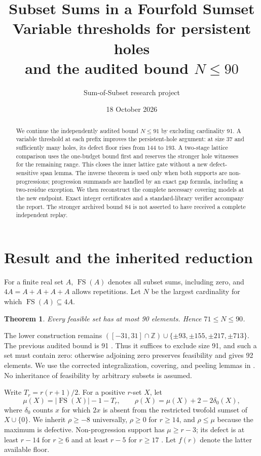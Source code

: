 \documentclass[11pt,a4paper]{article}
\title{Subset Sums in a Fourfold Sumset\\\large Variable thresholds for persistent holes\\and the audited bound $N\le90$}
\author{Sum-of-Subset research project}
\date{18 October 2026}
\newcommand{\FS}{\operatorname{FS}}
\newcommand{\Z}{\mathbb Z}
\newtheorem{theorem}{Theorem}[section]
\begin{document}
\maketitle
\begin{abstract}
We continue the independently audited bound $N\le91$ by excluding
cardinality 91. A variable threshold at each prefix improves the
persistent-hole argument: at size 37 and sufficiently many holes, its
defect floor rises from 144 to 193. A two-stage lattice comparison uses
the one-budget bound first and reserves the stronger hole witnesses for
the remaining range. This closes the inner lattice gate without a new
defect-sensitive span lemma. The inverse theorem is used only when both
supports are non-progressions; progression summands are handled by an
exact gap formula, including a two-residue exception. We then reconstruct
the complete necessary covering models at the new endpoint. Exact integer
certificates and a standard-library verifier accompany the report.
The stronger archived bound 84 is not asserted to have received a
complete independent replay.
\end{abstract}

\section{Result and the inherited reduction}
For a finite real set $A$, $\FS(A)$ denotes all subset sums, including
zero, and $4A=A+A+A+A$ allows repetitions. Let $N$ be the largest
cardinality for which $\FS(A)\subseteq4A$.
\begin{theorem}\label{main}
Every feasible set has at most 90 elements. Hence $71\le N\le90$.
\end{theorem}
The lower construction remains
$([-31,31]\cap\Z)\cup\{\pm93,\pm155,\pm217,\pm713\}$.
The previous audited bound is 91 \cite{previous}. Thus it suffices to
exclude size 91, and such a set must contain zero: otherwise adjoining
zero preserves feasibility and gives 92 elements. We use the corrected
integralization, covering, and peeling lemmas in \cite{foundation}.
No inheritance of feasibility by arbitrary subsets is assumed.

Write $T_r=r(r+1)/2$. For a positive $r$-set $X$, let
\[
 \mu(X)=|\FS(X)|-1-T_r,\qquad
 \rho(X)=\mu(X)+2-2\delta_0(X),
\]
where $\delta_0$ counts $x$ for which $2x$ is absent from the restricted
twofold sumset of $X\cup\{0\}$. We inherit $\rho\ge-8$ universally,
$\rho\ge0$ for $r\ge14$, and $\rho\le\mu$ because the maximum is
defective. Non-progression support has $\mu\ge r-3$; its defect is at
least $r-14$ for $r\ge6$ and at least $r-5$ for $r\ge17$ \cite{sharp}.
Let $f(r)$ denote the latter available floor.
\end{document}
